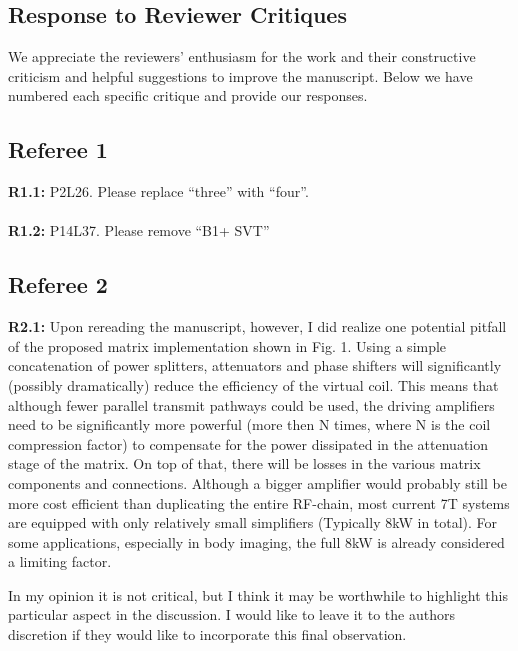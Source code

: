 \documentclass[11pt]{article}
\newcommand{\mysubsectionstar}[1]{\vspace{0mm}\subsection*{#1}\vspace{0mm}}
\begin{document}


\onecolumn

\setlength{\parskip}{0pt}

\clearpage
\newpage
\pagestyle{empty}		%

\footskip 15pt

\mysubsectionstar{Response to Reviewer Critiques}
We appreciate the reviewers' enthusiasm for the work and their constructive criticism and helpful suggestions to improve the manuscript.
Below we have numbered each specific critique and provide our responses.

\mysubsectionstar{Referee 1}
{\bf R1.1:} P2L26. Please replace ``three'' with ``four''.
\\[0.2em] 
\indent{\it \textcolor{blue}{Done.}}
\\[1.2em]
{\bf R1.2:} P14L37. Please remove ``B1+ SVT''
\\[0.2em]
\indent{\it \textcolor{blue}{Done.}}

\mysubsectionstar{Referee 2}
{\bf R2.1:} Upon rereading the manuscript, however, I did realize one potential pitfall of the proposed matrix implementation shown in Fig. 1. Using a simple concatenation of power splitters, attenuators and phase shifters will significantly (possibly dramatically) reduce the efficiency of the virtual coil. This means that although fewer parallel transmit pathways could be used, the driving amplifiers need to be significantly more powerful (more then N times, where N is the coil compression factor) to compensate for the power dissipated in the attenuation stage of the matrix. On top of that, there will be losses in the various matrix components and connections. Although a bigger amplifier would probably still be more cost efficient than duplicating the entire RF-chain, most current 7T systems are equipped with only relatively small simplifiers (Typically 8kW in total). For some applications, especially in body imaging, the full 8kW is already considered a limiting factor.
\par In my opinion it is not critical, but I think it may be worthwhile to highlight this particular aspect in the discussion. I would like to leave it to the authors discretion if they would like to incorporate this final observation.
\\[0.2em]
\indent{\it \textcolor{blue}{We agree that due to losses in the coil compression network, more RF
power will be required to create a given RF field strength compared to a full set of RF power amplifiers
driving the same coil array. At this early stage it is rather unclear just what those losses will be,
but we have added a statement to the Discussion that there will be some power loss so the total RF power requirements will
be increased.}}
\end{document}
